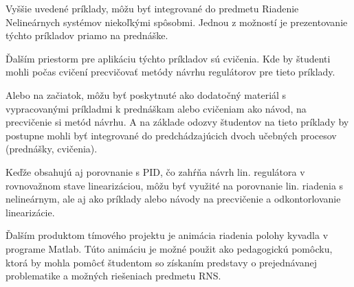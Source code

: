 \documentclass[../main.tex]{subfiles}
\begin{document}
    Vyššie uvedené príklady, môžu byť integrované do predmetu Riadenie Nelineárnych systémov niekoľkými spôsobmi. Jednou z možností je prezentovanie týchto príkladov priamo na prednáške.
    
    Ďalším priestorm pre aplikáciu týchto príkladov sú cvičenia. Kde by študenti mohli počas cvičení precvičovať metódy návrhu regulátorov pre tieto príklady.

    Alebo na začiatok, môžu byť poskytnuté ako dodatočný materiál s vypracovanými príkladmi k prednáškam alebo cvičeniam ako návod, na precvičenie si metód návrhu. A na základe odozvy študentov na tieto príklady by postupne mohli byť integrované do predchádzajúcich dvoch učebných procesov (prednášky, cvičenia). 

    Keďže obsahujú aj porovnanie s PID, čo zahŕňa návrh lin. regulátora v rovnovažnom stave linearizáciou, môžu byť využité na porovnanie lin. riadenia s nelineárnym, ale  aj ako príklady alebo návody na precvičenie a odkontorlovanie linearizácie. 

    Ďalším produktom tímového projektu je animácia riadenia polohy kyvadla v programe Matlab. Túto animáciu je možné použit ako pedagogickú pomôcku, ktorá by mohla pomôcť študentom so získaním predstavy o prejednávanej problematike a možných riešeniach predmetu RNS.

\end{document}

